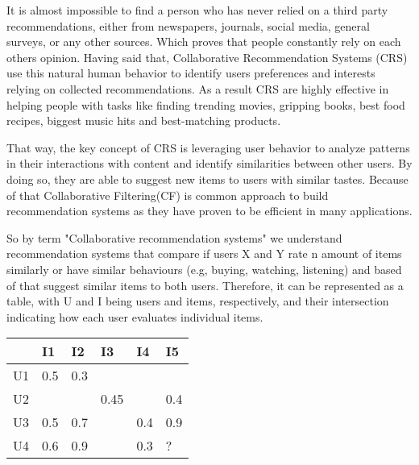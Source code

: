 \documentclass[10pt,a4paper]{article}
\begin{document}
It is almost impossible to find a person who has never relied on a third party recommendations, either from newspapers, journals, social media, general surveys, or any other sources.  Which proves that people constantly rely on each others opinion. Having said that, Collaborative Recommendation Systems (CRS) use this natural human behavior to identify  users preferences and interests relying on collected recommendations. As a result CRS are highly effective in helping people with tasks like finding trending movies, gripping books, best food recipes, biggest music hits and best-matching products.\cite{10.1155/2009/421425}

\hspace{0.2cm}

That way, the key concept of CRS is leveraging user behavior to analyze patterns in their interactions with content and identify similarities between other users. By doing so, they are able to suggest new items to users with similar tastes. Because of that Collaborative Filtering(CF) is common approach to build recommendation systems as they have proven to be efficient in many applications.
\cite{kumar2015role}

\hspace{0.2cm}

So by term "Collaborative recommendation systems" we understand  recommendation systems that compare if users X and Y  rate n amount of items similarly or have similar behaviours (e.g, buying, watching, listening)  and based of that suggest similar items to both users\cite{10.1155/2009/421425}. Therefore, it can be represented as a table, with U and I being users and items, respectively, and their intersection indicating how each user evaluates individual items.

\hspace{0.5cm}

\begin{center}
\begin{tabular}{ |C{1cm}|C{1cm}|C{1cm}|C{1cm}|C{1cm}|C{1cm}| }
\hline
  & I1 & I2 & I3 & I4 & I5  \\
 \hline
 U1 & 0.5 & 0.3 &  &  &  \\  
 \hline
 U2 &  &  & 0.45 &  & 0.4 \\
 \hline
 U3 & 0.5 & 0.7 &  & 0.4 & 0.9 \\
 \hline
 U4 & 0.6 & 0.9 &  & 0.3 & ? \\
 \hline
\end{tabular}
\end{center}
\end{document}
